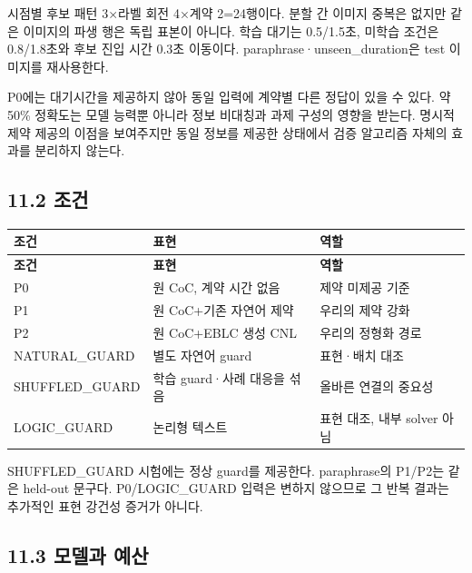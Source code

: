 \documentclass[11pt,a4paper]{article}
\begin{document}
시점별 후보 패턴 3×라벨 회전 4×계약 2=24행이다. 분할 간 이미지 중복은 없지만 같은 이미지의 파생 행은 독립 표본이 아니다. 학습 대기는 0.5/1.5초, 미학습 조건은 0.8/1.8초와 후보 진입 시간 0.3초 이동이다. paraphrase·unseen\_\allowbreak{}duration은 test 이미지를 재사용한다.\par

P0에는 대기시간을 제공하지 않아 동일 입력에 계약별 다른 정답이 있을 수 있다. 약 50\% 정확도는 모델 능력뿐 아니라 정보 비대칭과 과제 구성의 영향을 받는다. 명시적 제약 제공의 이점을 보여주지만 동일 정보를 제공한 상태에서 검증 알고리즘 자체의 효과를 분리하지 않는다.\par

\subsection*{11.2 조건}

\begingroup\small
\begin{longtable}{@{}>{\raggedright\arraybackslash}p{}>{\raggedright\arraybackslash}p{}>{\raggedright\arraybackslash}p{}@{}}
\toprule
\textbf{조건} & \textbf{표현} & \textbf{역할} \\
\midrule\endfirsthead
\toprule
\textbf{조건} & \textbf{표현} & \textbf{역할} \\
\midrule\endhead
\bottomrule\endfoot
P0 & 원 CoC, 계약 시간 없음 & 제약 미제공 기준 \\
P1 & 원 CoC+기존 자연어 제약 & 우리의 제약 강화 \\
P2 & 원 CoC+EBLC 생성 CNL & 우리의 정형화 경로 \\
NATURAL\_\allowbreak{}GUARD & 별도 자연어 guard & 표현·배치 대조 \\
SHUFFLED\_\allowbreak{}GUARD & 학습 guard·사례 대응을 섞음 & 올바른 연결의 중요성 \\
LOGIC\_\allowbreak{}GUARD & 논리형 텍스트 & 표현 대조, 내부 solver 아님 \\
\end{longtable}
\endgroup

SHUFFLED\_\allowbreak{}GUARD 시험에는 정상 guard를 제공한다. paraphrase의 P1/P2는 같은 held-out 문구다. P0/LOGIC\_\allowbreak{}GUARD 입력은 변하지 않으므로 그 반복 결과는 추가적인 표현 강건성 증거가 아니다.\par

\clearpage\subsection*{11.3 모델과 예산}
\end{document}
